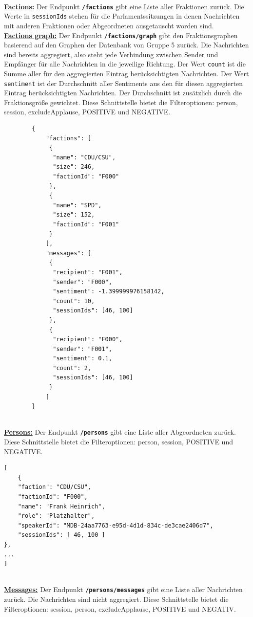 ~\\	
\textbf{\underline{Factions:}} 
\newline
Der Endpunkt \textbf{\texttt{/factions}} gibt eine Liste aller Fraktionen zurück. Die Werte in \texttt{sessionIds} stehen für die Parlamentssitzungen in denen Nachrichten mit anderen Fraktionen oder Abgeordneten ausgetauscht worden sind.
\newpage
~\\		
\textbf{\underline{Factions graph:}} \newline
Der Endpunkt \textbf{\texttt{/factions/graph}} gibt den Fraktionsgraphen basierend auf den Graphen der Datenbank von Gruppe 5 zurück. Die Nachrichten sind bereits aggregiert, also steht jede Verbindung zwischen Sender und Empfänger für alle Nachrichten in die jeweilige Richtung. Der Wert \texttt{count} ist die Summe aller für den aggregierten Eintrag berücksichtigten Nachrichten. Der Wert \texttt{sentiment} ist der Durchschnitt aller Sentiments aus den für diesen aggregierten Eintrag berücksichtigten Nachrichten. Der Durchschnitt ist zusätzlich durch die Fraktionsgröße gewichtet. Diese Schnittstelle bietet die Filteroptionen: person, session, excludeApplause, POSITIVE und NEGATIVE.	
\begin{lstlisting}
		{
			"factions": [
			 {
			  "name": "CDU/CSU",
			  "size": 246, 
			  "factionId": "F000"
			 },
			 {
			  "name": "SPD",
			  "size": 152,
			  "factionId": "F001"
			 }
			],
			"messages": [
			 {
			  "recipient": "F001",
			  "sender": "F000",
			  "sentiment": -1.399999976158142,
			  "count": 10,
			  "sessionIds": [46, 100]
			 },
			 {
			  "recipient": "F000",
			  "sender": "F001",
			  "sentiment": 0.1,
			  "count": 2,
			  "sessionIds": [46, 100]
			 }
			]
		}
\end{lstlisting}
\newpage
~\\	
\textbf{\underline{Persons:}}\newline
Der Endpunkt \textbf{\texttt{/persons}} gibt eine Liste aller Abgeordneten zurück. Diese Schnittstelle bietet die Filteroptionen: person, session, POSITIVE und NEGATIVE.
\begin{lstlisting}
[
    {
    "faction": "CDU/CSU",
    "factionId": "F000", 
    "name": "Frank Heinrich", 
    "role": "Platzhalter", 
    "speakerId": "MDB-24aa7763-e95d-4d1d-834c-de3cae2406d7",
    "sessionIds": [ 46, 100 ]
}, 
...
]
\end{lstlisting}
~\\
\textbf{\underline{Messages:}}\newline
Der Endpunkt \textbf{\texttt{/persons/messages}} gibt eine Liste aller Nachrichten zurück. Die Nachrichten sind nicht aggregiert. Diese Schnittstelle bietet die Filteroptionen: session, person, excludeApplause, POSITIVE und NEGATIV.	

